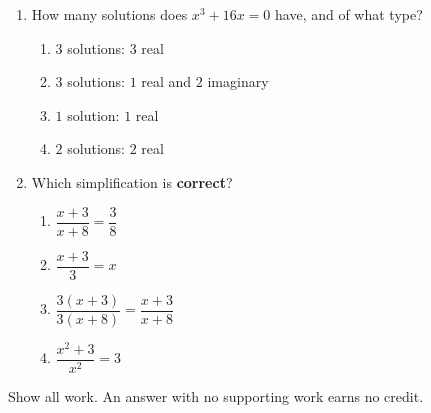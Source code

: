 \begin{enumerate}[leftmargin=1.8em, itemsep=6pt, topsep=5pt]
\item How many solutions does $x^3+16x=0$ have, and of what type?
\begin{enumerate}[label=(\Alph*), leftmargin=2.2em, itemsep=1pt, topsep=2pt]
  \item $3$ solutions: $3$ real
  \item $3$ solutions: $1$ real and $2$ imaginary
  \item $1$ solution: $1$ real
  \item $2$ solutions: $2$ real
\end{enumerate}

\item Which simplification is \textbf{correct}?
\begin{enumerate}[label=(\Alph*), leftmargin=2.2em, itemsep=1pt, topsep=2pt]
  \item $\dfrac{x+3}{x+8} = \dfrac{3}{8}$
  \item $\dfrac{x+3}{3} = x$
  \item $\dfrac{3(x+3)}{3(x+8)} = \dfrac{x+3}{x+8}$
  \item $\dfrac{x^2+3}{x^2} = 3$
\end{enumerate}

\end{enumerate}


\noindent\small Show all work. An answer with no supporting work earns no credit.

